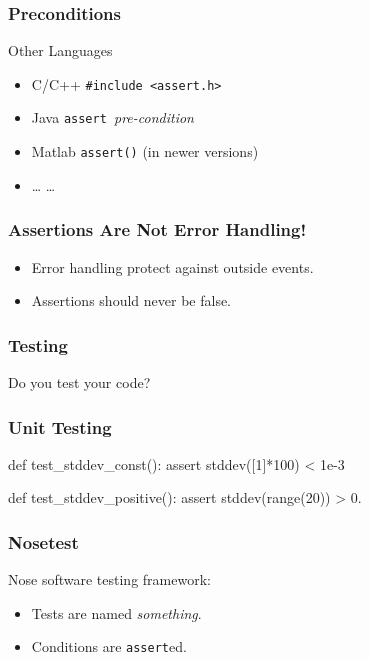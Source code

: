 \begin{frame}[fragile]
\frametitle{Preconditions}
\begin{block}{Other Languages}
\begin{itemize}
\item \alert{C/C++} \lstinline{#include <assert.h>}
\item \alert{Java} \lstinline{assert }\textit{pre-condition}
\item \alert{Matlab} \lstinline{assert()} (in newer versions)
\item \alert{\ldots} \ldots
\end{itemize}
\end{block}
\end{frame}

\begin{frame}[fragile]
\frametitle{Assertions Are Not Error Handling!}

\begin{itemize}
\item Error handling protect against outside events.
\item Assertions \alert{should never} be false.
\end{itemize}
\end{frame}


\begin{frame}[fragile]
\frametitle{Testing}

Do you test your code?

\end{frame}

\begin{frame}[fragile]
\frametitle{Unit Testing}

\begin{python}
def test_stddev_const():
    assert stddev([1]*100) < 1e-3

def test_stddev_positive():
    assert stddev(range(20)) > 0.
\end{python}

\end{frame}

\begin{frame}[fragile]
\frametitle{Nosetest}

Nose software testing framework:
\begin{itemize}
\item Tests are named \textit{something}.
\item Conditions are \lstinline{assert}ed.
\end{itemize}

\end{frame}

